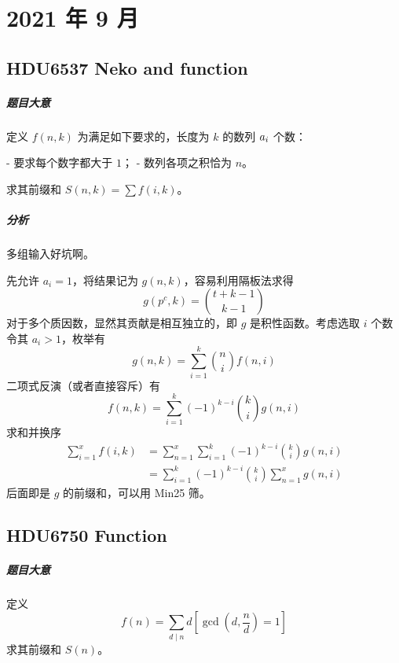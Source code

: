 \chapter{2021 年 9 月}

\section{HDU6537 Neko and function}

\paragraph{题目大意}

定义 $f(n, k)$ 为满足如下要求的，长度为 $k$ 的数列 $\\{a_i\\}$ 个数：

- 要求每个数字都大于 $1$；
- 数列各项之积恰为 $n$。

求其前缀和 $S(n, k) = \sum f(i, k)$。

\paragraph{分析}

多组输入好坑啊。

先允许 $a_i=1$，将结果记为 $g(n,k)$，容易利用隔板法求得
\[ g (p^c, k) = \binom{t + k - 1}{k - 1} \]
对于多个质因数，显然其贡献是相互独立的，即 $g$ 是积性函数。考虑选取 $i$ 个数令其 $a_i>1$，枚举有
\[ g (n, k) = \sum_{i = 1}^k \binom{n}{i} f (n, i) \]
二项式反演（或者直接容斥）有
\[ f (n, k) = \sum_{i = 1}^k (- 1)^{k - i} \binom{k}{i} g (n, i) \]
求和并换序
\[ \begin{aligned}
\sum_{i = 1}^x f (i, k) &= \sum_{n = 1}^x \sum_{i = 1}^k (- 1)^{k - i} \binom{k}{i} g (n, i) \\
&= \sum_{i = 1}^k (- 1)^{k - i} \binom{k}{i} \sum_{n = 1}^x g (n, i)
\end{aligned} \]
后面即是 $g$ 的前缀和，可以用 Min25 筛。

\section{HDU6750 Function}

\paragraph{题目大意}

定义
\[ f (n) = \sum_{d \mid n} d \left[ \gcd \left( d, \frac{n}{d} \right) = 1 \right] \]
求其前缀和 $S(n)$。


